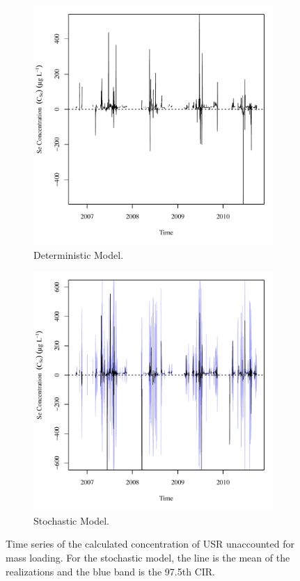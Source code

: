 \begin{linenumbers}
\begin{figure}[htbp]
\centering
	\begin{subfigure}{0.5\textwidth}
		\centering
		\includegraphics[width=0.9\linewidth]{"Figures/Results_USR/Deterministic/Balance C"}
		\caption{Deterministic Model.}
	\end{subfigure}%
	\begin{subfigure}{0.5\textwidth}
		\centering
		\includegraphics[width=0.9\linewidth]{"Figures/Results_USR/Stochastic/Balance C"}
		\caption{Stochastic Model.}
	\end{subfigure}
	\caption[Time series of the calculated concentration of USR unaccounted for mass loading.]{Time series of the calculated concentration of USR unaccounted for mass loading.  For the stochastic model, the line is the mean of the realizations and the blue band is the 97.5th CIR.}
	\label{fig:USRConc}
\end{figure}


\end{linenumbers}
